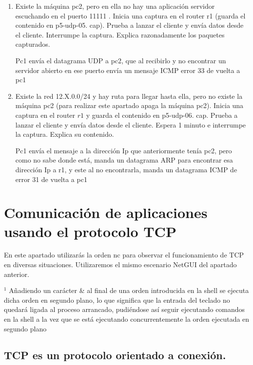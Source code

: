 \documentclass[12pt, a4paper]{report}
\begin{document}
\begin{enumerate}
	\item Existe la máquina pc2, pero en ella no hay una aplicación servidor escuchando en el puerto 11111 . Inicia una captura en el router r1 (guarda el contenido en p5-udp-05. cap). Prueba a lanzar el cliente y envía datos desde el cliente. Interrumpe la captura. Explica razonadamente los paquetes capturados.
	
	Pc1 envía el datagrama UDP a pc2, que al recibirlo y no encontrar un servidor abierto en ese puerto envía un mensaje ICMP error 33 de vuelta a pc1
	
	\item Existe la red 12.X.0.0/24 y hay ruta para llegar hasta ella, pero no existe la máquina pc2 (para realizar este apartado apaga la máquina pc2). Inicia una captura en el router $r 1$ y guarda el contenido en p5-udp-06. cap. Prueba a lanzar el cliente y envía datos desde el cliente. Espera 1 minuto e interrumpe la captura. Explica su contenido.
	
	Pc1 envía el mensaje a la dirección Ip que anteriormente tenía pc2, pero como no sabe donde está, manda un datagrama ARP para encontrar esa dirección Ip a r1, y este al no encontrarla, manda un datagrama ICMP de error 31 de vuelta a pc1
	
\end{enumerate}

\chapter{Comunicación de aplicaciones usando el protocolo TCP}
En este apartado utilizarás la orden nc para observar el funcionamiento de TCP en diversas situaciones. Utilizaremos el mismo escenario NetGUI del apartado anterior.

${ }^{1}$ Añadiendo un carácter \& al final de una orden introducida en la shell se ejecuta dicha orden en segundo plano, lo que significa que la entrada del teclado no quedará ligada al proceso arrancado, pudiéndose así seguir ejecutando comandos en la shell a la vez que se está ejecutando concurrentemente la orden ejecutada en segundo plano

\section{TCP es un protocolo orientado a conexión.}
\end{document}

